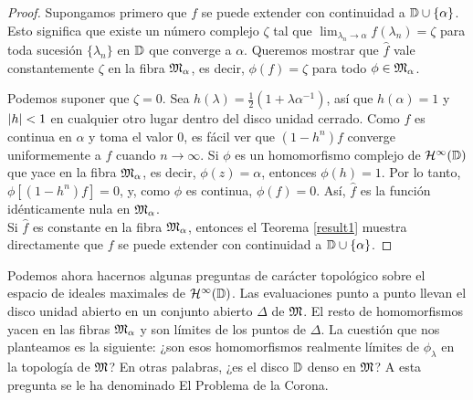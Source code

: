 \begin{proof}
    Supongamos primero que $f$ se puede extender con continuidad a $\mathbb{D} \cup \{ \alpha\}$. Esto significa que existe un número complejo $\zeta$ tal que $\lim_{\lambda_n \rightarrow \alpha} f(\lambda_n) = \zeta$ para toda sucesión $\{\lambda_n\}$ en $\mathbb{D}$ que converge a $\alpha$. Queremos mostrar que $\hat f$ vale constantemente $\zeta$ en la fibra $\mathfrak{M}_\alpha$, es decir, $\phi(f) = \zeta$ para todo $\phi \in \mathfrak{M}_\alpha$.

    Podemos suponer que $\zeta = 0$. Sea $h(\lambda) = \frac{1}{2} (1 + \lambda \alpha^{-1})$, así que $h(\alpha) = 1$ y $\left\lvert h\right\rvert < 1$ en cualquier otro lugar dentro del disco unidad cerrado. Como $f$ es continua en $\alpha$ y toma el valor $0$, es fácil ver que $(1 - h^n) f$ converge uniformemente a $f$ cuando $n \rightarrow \infty$. Si $\phi$ es un homomorfismo complejo de $\mathcal{H}^{\infty}(\mathbb{D})$ que yace en la fibra $\mathfrak{M}_\alpha$, es decir, $\phi (z) = \alpha$, entonces $\phi (h) = 1$. Por lo tanto, $\phi [(1 - h^n)f] = 0$, y, como $\phi$ es continua, $\phi (f) = 0$. Así, $\hat f$ es la función idénticamente nula en $\mathfrak{M}_\alpha$. \\


    Si $\hat f$ es constante en la fibra $\mathfrak{M}_\alpha$, entonces el Teorema \ref{result1} muestra directamente que $f$ se puede extender con continuidad a $\mathbb{D} \cup \{ \alpha \}$.
\end{proof}

\bigskip

Podemos ahora hacernos algunas preguntas de carácter topológico sobre el espacio de ideales maximales de $\mathcal{H}^{\infty}(\mathbb{D})$. Las evaluaciones punto a punto llevan el disco unidad abierto en un conjunto abierto $\Delta$ de $\mathfrak{M}$. El resto de homomorfismos yacen en las fibras $\mathfrak{M}_\alpha$ y son límites de los puntos de $\Delta$. La cuestión que nos planteamos es la siguiente: ¿son esos homomorfismos realmente límites de $\phi_\lambda$ en la topología de $\mathfrak{M}$? En otras palabras, ¿es el disco $\mathbb{D}$ denso en $\mathfrak{M}$? A esta pregunta se le ha denominado El Problema de la Corona.

